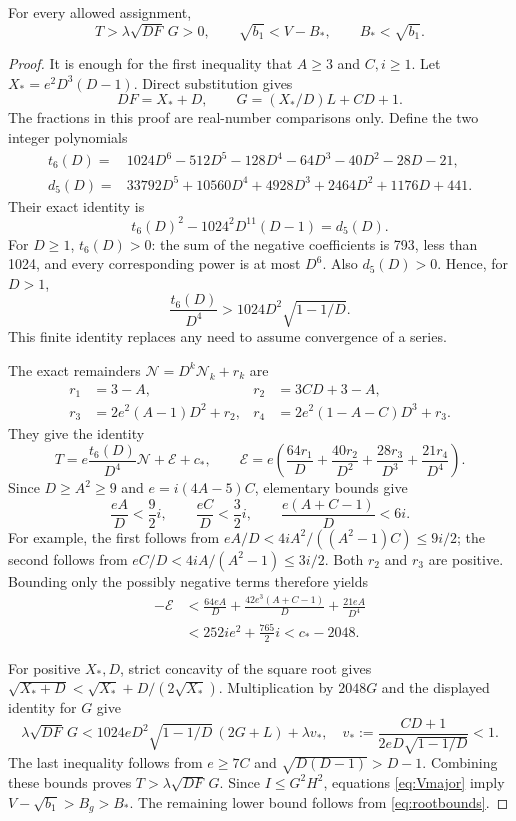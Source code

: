 \begin{lemma}\label{lem:majorant}
For every allowed assignment,
\[
 T>\lambda\sqrt{DF}\,G>0,
 \qquad \sqrt{b_1}<V-B_*,
 \qquad B_*<\sqrt{b_1}.
\]
\end{lemma}
\begin{proof}
It is enough for the first inequality that $A\ge3$ and $C,i\ge1$.
Let $X_*=e^2D^3(D-1)$. Direct substitution gives
\[
 DF=X_*+D,\qquad G=(X_*/D)L+CD+1.
\]
The fractions in this proof are real-number comparisons only.
Define the two integer polynomials
\begin{align*}
 t_6(D)={}&1024D^6-512D^5-128D^4-64D^3-40D^2-28D-21,\\
 d_5(D)={}&33792D^5+10560D^4+4928D^3+2464D^2+1176D+441.
\end{align*}
Their exact identity is
\begin{equation}\label{eq:tnidentity}
 t_6(D)^2-1024^2D^{11}(D-1)=d_5(D).
\end{equation}
For $D\ge1$, $t_6(D)>0$: the sum of the negative coefficients is 793,
less than 1024, and every corresponding power is at most $D^6$.
Also $d_5(D)>0$. Hence, for $D>1$,
\[
 \frac{t_6(D)}{D^4}>1024D^2\sqrt{1-1/D}.
\]
This finite identity replaces any need to assume convergence of a series.

The exact remainders $\mathcal N=D^k\mathcal N_k+r_k$ are
\begin{align*}
 r_1&=3-A, &r_2&=3CD+3-A,\\
 r_3&=2e^2(A-1)D^2+r_2, &
 r_4&=2e^2(1-A-C)D^3+r_3.
\end{align*}
They give the identity
\[
 T=e\frac{t_6(D)}{D^4}\mathcal N+\mathcal E+c_*,
 \qquad
 \mathcal E=e\left(\frac{64r_1}{D}+\frac{40r_2}{D^2}
                    +\frac{28r_3}{D^3}+\frac{21r_4}{D^4}\right).
\]
Since $D\ge A^2\ge9$ and $e=i(4A-5)C$, elementary bounds give
\[
 \frac{eA}{D}<\frac92 i,\qquad
 \frac{eC}{D}<\frac32 i,\qquad
 \frac{e(A+C-1)}{D}<6i.
\]
For example, the first follows from
$eA/D<4iA^2/((A^2-1)C)\le9i/2$; the second follows from
$eC/D<4iA/(A^2-1)\le3i/2$. Both $r_2$ and $r_3$ are positive.
Bounding only the possibly negative terms therefore yields
\begin{align*}
 -\mathcal E
 &<\frac{64eA}{D}+\frac{42e^3(A+C-1)}{D}+\frac{21eA}{D^4}\\
 &<252ie^2+\frac{765}{2}i<c_*-2048.
\end{align*}

For positive $X_*,D$, strict concavity of the square root gives
$\sqrt{X_*+D}<\sqrt{X_*}+D/(2\sqrt{X_*})$.
Multiplication by $2048G$ and the displayed identity for $G$ give
\[
 \lambda\sqrt{DF}\,G
 <1024eD^2\sqrt{1-1/D}\,(2G+L)+\lambda v_*,
 \quad
 v_*:=\frac{CD+1}{2eD\sqrt{1-1/D}}<1.
\]
The last inequality follows from $e\ge7C$ and
$\sqrt{D(D-1)}>D-1$. Combining these bounds proves
$T>\lambda\sqrt{DF}\,G$.
Since $I\le G^2H^2$, equations \eqref{eq:Vmajor} imply
$V-\sqrt{b_1}>B_g>B_*$. The remaining lower bound follows from
\eqref{eq:rootbounds}.
\end{proof}

